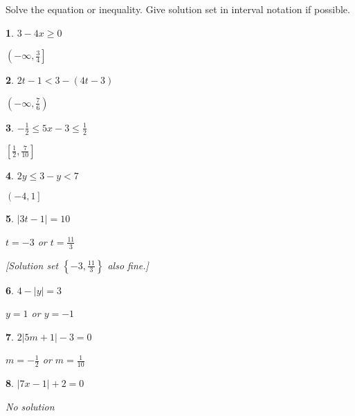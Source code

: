 \documentclass{amsbook}
\newtheorem{exc}{}
\newenvironment{ex}{\begin{exc}\normalfont}{\end{exc}}
\numberwithin{section}{chapter}
\numberwithin{equation}{chapter}
\newcommand{\ds}{\displaystyle}
\begin{document}
Solve the equation or inequality. Give solution set in interval notation if possible.

\begin{multicols}{2}
\begin{ex}
	$3-4x \geq 0$
	\begin{sol}
		$\left(-\infty, \frac{3}{4}\right]$
	\end{sol}
\end{ex}

\begin{ex}
$\ds{ 2t-1 < 3-(4t-3)  }$
	\begin{sol}
		$\left(-\infty, \frac{7}{6}\right)$
	\end{sol}
\end{ex}

\begin{ex}
	$\ds{ -\frac{1}{2} \leq 5x-3 \leq \frac{1}{2}   }$
	\begin{sol}
		$\left[\frac{1}{2}, \frac{7}{10}  \right]$
	\end{sol}
\end{ex}

\begin{ex}
	$\ds{ 2y \leq 3-y < 7  }$
	\begin{sol}
		$\left(-4, 1\right]$
	\end{sol}
\end{ex}

\begin{ex}
	$\ds{ |3t-1|=10  }$
	\begin{sol}
		$t=-3$ or $t=\frac{11}{3}$
		
		 [Solution set $\left\{-3, \frac{11}{3}\right\} $ also fine.]
	\end{sol}
\end{ex}

\begin{ex}
	$\ds{ 4-|y| = 3  }$
	\begin{sol}
		$y=1$ or $y=-1$
	\end{sol}
\end{ex}

\begin{ex}
	$\ds{ 2|5m+1|-3=0  }$
	\begin{sol}
		$m=-\frac{1}{2}$ or $m=\frac{1}{10}$
	\end{sol}
\end{ex}


\begin{ex}
	$\ds{ |7x-1|+2 = 0  }$
	\begin{sol}
		No solution
	\end{sol}
\end{ex}



\end{multicols}
\end{document}
